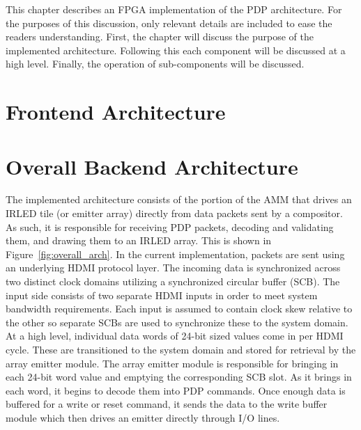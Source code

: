 \label{chap:implementation}
This chapter describes an FPGA implementation of the PDP architecture. For the purposes of this discussion, only relevant details are included to ease the readers understanding. First, the chapter will discuss the purpose of the implemented architecture. Following this each component will be discussed at a high level. Finally, the operation of sub-components will be discussed.
\section{Frontend Architecture}
    \label{sec:frontend_arch}

\section{Overall Backend Architecture}
    \label{sec:backend_arch}
    The implemented architecture consists of the portion of the AMM that drives an IRLED tile (or emitter array) directly from data packets sent by a compositor. As such, it is responsible for receiving PDP packets, decoding and validating them, and drawing them to an IRLED array. This is shown in Figure~\ref{fig:overall_arch}. In the current implementation, packets are sent using an underlying HDMI protocol layer. The incoming data is synchronized across two distinct clock domains utilizing a synchronized circular buffer (SCB). The input side consists of two separate HDMI inputs in order to meet system bandwidth requirements. Each input is assumed to contain clock skew relative to the other so separate SCBs are used to synchronize these to the system domain. At a high level, individual data words of 24-bit sized values come in per HDMI cycle. These are transitioned to the system domain and stored for retrieval by the array emitter module. The array emitter module is responsible for bringing in each 24-bit word value and emptying the corresponding SCB slot. As it brings in each word, it begins to decode them into PDP commands. Once enough data is buffered for a write or reset command, it sends the data to the write buffer module which then drives an emitter directly through I/O lines.


